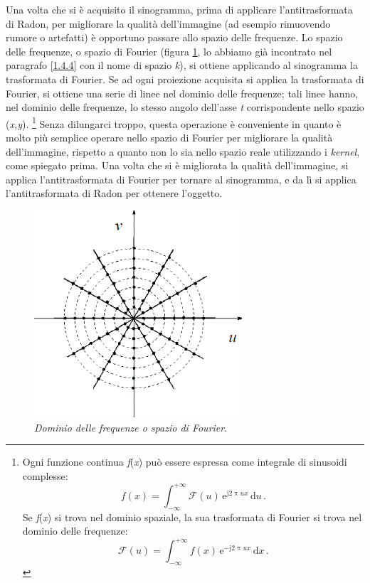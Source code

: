 \documentclass{report}
\newcommand{\figref}[1]{figura \ref{#1}}
\numberwithin{equation}{section}
\numberwithin{figure}{section}
\begin{document}
Una volta che si è acquisito il sinogramma, prima di applicare l'antitrasformata di Radon, per migliorare la qualità dell'immagine (ad esempio rimuovendo rumore o artefatti) è opportuno passare allo spazio delle frequenze. Lo spazio delle frequenze, o spazio di Fourier (\figref{fig:frequenze}, lo abbiamo già incontrato nel paragrafo \ref{1.4.4} con il nome di spazio \textit{k}), si ottiene applicando al sinogramma la trasformata di Fourier. Se ad ogni proiezione acquisita si applica la trasformata di Fourier, si ottiene una serie di linee nel dominio delle frequenze; tali linee hanno, nel dominio delle frequenze, lo stesso angolo dell'asse \textit{t} corrispondente nello spazio (\textit{x,y}).%
\footnote{Ogni funzione continua \textit{f}(\textit{x}) può essere espressa come integrale di sinusoidi complesse:
\begin{equation*}
    f(x) = \int_{-\infty}^{+\infty} \mathcal{F}(u)\,\mathrm{e}^{\mathrm{j} 2\uppi ux}\,\mathrm{d}u\,.
\end{equation*}
Se \textit{f}(\textit{x}) si trova nel dominio spaziale, la sua trasformata di Fourier si trova nel dominio delle frequenze:
\begin{equation*}
    \mathcal{F}(u) = \int_{-\infty}^{+\infty} f(x)\,\mathrm{e}^{-\mathrm{j} 2\uppi ux}\,\mathrm{d}x\,.
\end{equation*}}
Senza dilungarci troppo, questa operazione è conveniente in quanto è molto più semplice operare nello spazio di Fourier per migliorare la qualità dell'immagine, rispetto a quanto non lo sia nello spazio reale utilizzando i \textit{kernel}, come spiegato prima. Una volta che si è migliorata la qualità dell'immagine, si applica l'antitrasformata di Fourier per tornare al sinogramma, e da lì si applica l'antitrasformata di Radon per ottenere l'oggetto.

\begin{figure}[htp]
\centering
\includegraphics{immagini/frequenze.png}
\caption{\label{fig:frequenze} \textit{Dominio delle frequenze o spazio di Fourier}.}
\end{figure}
\end{document}
